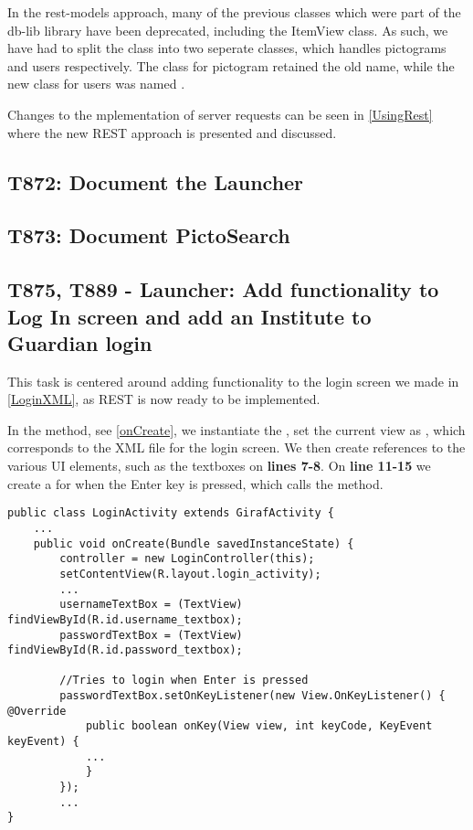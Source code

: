 In the rest-models approach, many of the previous classes which were part of
the db-lib library have been deprecated, including the ItemView class. As such,
we have had to split the  class into two seperate
classes, which handles pictograms and users respectively. The class for
pictogram retained the old name, while the new class for users was named
.\nl

Changes to the mplementation of server requests can be seen in
\autoref{UsingRest} where the new REST approach is presented and discussed.

\subsection{T872: Document the Launcher}

\subsection{T873: Document PictoSearch}

\subsection{T875, T889 - Launcher: Add functionality to Log In screen and add an
Institute to Guardian login}

This task is centered around adding functionality to the login screen we made
in \autoref{LoginXML}, as REST is now ready to be implemented.\nl

In the  method, see \autoref{onCreate}, we instantiate the
, set the current view as
, which corresponds to the XML file for the
login screen. We then create references to the various UI elements, such as the
textboxes on \textbf{lines 7-8}. On \textbf{line 11-15} we create a
 for when the Enter key is pressed, which calls the
 method.\nl

\begin{minipage}[H]{\linewidth}
\begin{lstlisting}[caption = ???, label = onCreate] 
public class LoginActivity extends GirafActivity {
	...
	public void onCreate(Bundle savedInstanceState) {
		controller = new LoginController(this);
    	setContentView(R.layout.login_activity);
		...
        usernameTextBox = (TextView) findViewById(R.id.username_textbox);
        passwordTextBox = (TextView) findViewById(R.id.password_textbox);
        
        //Tries to login when Enter is pressed
    	passwordTextBox.setOnKeyListener(new View.OnKeyListener() { @Override
            public boolean onKey(View view, int keyCode, KeyEvent keyEvent) {
            ...
            }
        });
        ...
}
\end{lstlisting}
\end{minipage}

